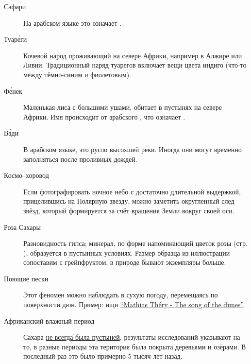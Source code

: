 \documentclass[a5paper,11pt]{memoir}
\begin{document}
\begin{description}
\item[Сафари] На арабском языке это означает .

\item[Туар\'{е}ги] Кочевой народ проживающий на севере Африки, например в Алжире или Ливии. Традиционный наряд туарегов включает вещи цвета индиго (что-то между тёмно-синим и фиолетовым).


\item[Ф\'{е}нек] Маленькая лиса с большими ушами, обитает в пустынях на севере Африки. Имя происходит от арабского , что означает . 


\item[В\'{а}ди] В арабском языке, это русло высохшей реки. Иногда они могут временно заполняться после проливных дождей.

\item[Космо--хоровод] Если фотографировать ночное небо с достаточно длительной выдержкой, прицелившись на Полярную звезду, можно заметить округленный след звёзд, который формируется за счёт вращения Земли вокруг своей оси.

\item[Роза Сахары] Разновидность гипса; минерал, по форме напоминающий цветок розы (стр. \pageref{fig:desert-rose}), образуется в пустынных условиях. Размер образца из иллюстрации сопоставим с грейпфруктом, в природе бывают экземпляры больше.


\item[Поющие пески] Этот феномен можно наблюдать в сухую погоду, перемещаясь по поверхности дюн. Пример: ищи \href{https://youtu.be/4yFaMsUawi4}{``Mathias Th\'ery - The song of the dunes''}.

\item[Африканский влажный период] Сахара \href{https://ru.wikipedia.org/wiki/%D0%A1%D0%B0%D1%85%D0%B0%D1%80%D0%B0#%D0%98%D1%81%D1%82%D0%BE%D1%80%D0%B8%D1%8F}{не всегда была пустыней}, результаты исследований указывают на то, в разные периоды эта територия была покрыта деревьями и озёрами. В последный раз это было примерно 5 тысяч лет назад.
\end{description}


\vfill
\vspace{100pt}   %
\end{document}
